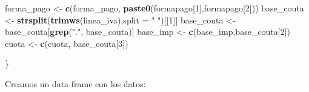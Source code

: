 \documentclass[,,,oneauthor,pdftex]{Definitions/mdpi}
\newenvironment{Shaded}{\begin{snugshade}}{\end{snugshade}}
\newcommand{\AttributeTok}[1]{\textcolor[rgb]{0.13,0.29,0.53}{#1}}
\newcommand{\DecValTok}[1]{\textcolor[rgb]{0.00,0.00,0.81}{#1}}
\newcommand{\FunctionTok}[1]{\textcolor[rgb]{0.13,0.29,0.53}{\textbf{#1}}}
\newcommand{\NormalTok}[1]{#1}
\newcommand{\OtherTok}[1]{\textcolor[rgb]{0.56,0.35,0.01}{#1}}
\newcommand{\StringTok}[1]{\textcolor[rgb]{0.31,0.60,0.02}{#1}}
\begin{document}
\begin{Shaded}
\begin{Highlighting}[]
\NormalTok{  forma\_pago }\OtherTok{\textless{}{-}} \FunctionTok{c}\NormalTok{(forma\_pago, }\FunctionTok{paste0}\NormalTok{(formapago[}\DecValTok{1}\NormalTok{],formapago[}\DecValTok{2}\NormalTok{]))}
\NormalTok{  base\_couta }\OtherTok{\textless{}{-}} \FunctionTok{strsplit}\NormalTok{(}\FunctionTok{trimws}\NormalTok{(linea\_iva),}\AttributeTok{split =} \StringTok{" "}\NormalTok{)[[}\DecValTok{1}\NormalTok{]]}
\NormalTok{  base\_couta }\OtherTok{\textless{}{-}}\NormalTok{ base\_couta[}\FunctionTok{grep}\NormalTok{(}\StringTok{"."}\NormalTok{, base\_couta)]}
\NormalTok{  base\_imp }\OtherTok{\textless{}{-}} \FunctionTok{c}\NormalTok{(base\_imp,base\_couta[}\DecValTok{2}\NormalTok{])}
\NormalTok{  cuota }\OtherTok{\textless{}{-}} \FunctionTok{c}\NormalTok{(cuota, base\_couta[}\DecValTok{3}\NormalTok{])}
  
\NormalTok{\}}
\end{Highlighting}
\end{Shaded}

Creamos un data frame con los datos:
\end{document}
